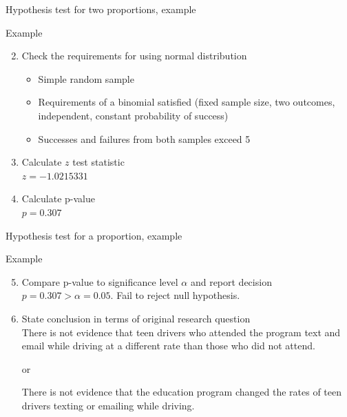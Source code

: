 \documentclass[xcolor=table]{beamer}
\begin{document}
\begin{frame}{Hypothesis test for two proportions, example}
\begin{exampleblock}{Example}
\large
\begin{enumerate}
\setcounter{enumi}{1}
\item Check the requirements for using normal distribution
\pause\begin{itemize}
\item Simple random sample
\item Requirements of a binomial satisfied (fixed sample size, two outcomes, independent, constant probability of success)
\item Successes and failures from both samples exceed 5
\end{itemize}
\pause\item Calculate $z$ test statistic\\
\pause$z = -1.0215331$
\pause\item Calculate p-value\\
\pause$p = 0.307$
\end{enumerate}
\end{exampleblock}
\end{frame}

\begin{frame}{Hypothesis test for a proportion, example}
\begin{exampleblock}{Example}
\large
\begin{enumerate}
\setcounter{enumi}{4}
\item Compare p-value to significance level $\alpha$ and report decision\\
\pause$p = 0.307 > \alpha =0.05$. Fail to reject null hypothesis.

\pause\item State conclusion in terms of original research question\\
\pause There is not evidence that teen drivers who attended the program text and email while driving at a different rate than those who did not attend.\\
{\centering or \par}\smallskip
There is not evidence that the education program changed the rates of teen drivers texting or emailing while driving.
\end{enumerate}

\end{exampleblock}
\end{frame}
\end{document}
